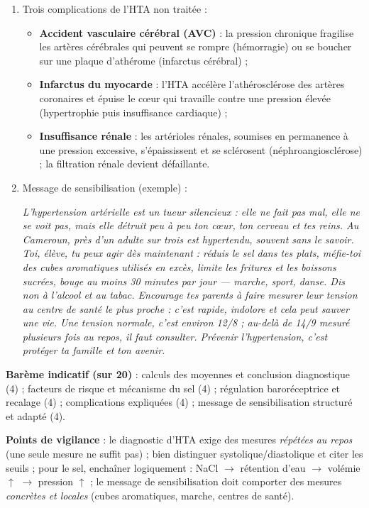 \documentclass[11pt]{article}
\begin{document}
\begin{corrige}
\begin{enumerate}
\item Trois complications de l'HTA non traitée :
\begin{itemize}
\item \textbf{Accident vasculaire cérébral (AVC)} : la pression chronique fragilise les artères cérébrales qui peuvent se rompre (hémorragie) ou se boucher sur une plaque d'athérome (infarctus cérébral) ;
\item \textbf{Infarctus du myocarde} : l'HTA accélère l'athérosclérose des artères coronaires et épuise le cœur qui travaille contre une pression élevée (hypertrophie puis insuffisance cardiaque) ;
\item \textbf{Insuffisance rénale} : les artérioles rénales, soumises en permanence à une pression excessive, s'épaississent et se sclérosent (néphroangiosclérose) ; la filtration rénale devient défaillante.
\end{itemize}
\item Message de sensibilisation (exemple) :

\og \emph{L'hypertension artérielle est un tueur silencieux : elle ne fait pas mal, elle ne se voit pas, mais elle détruit peu à peu ton cœur, ton cerveau et tes reins. Au Cameroun, près d'un adulte sur trois est hypertendu, souvent sans le savoir. Toi, élève, tu peux agir dès maintenant : réduis le sel dans tes plats, méfie-toi des cubes aromatiques utilisés en excès, limite les fritures et les boissons sucrées, bouge au moins 30 minutes par jour — marche, sport, danse. Dis non à l'alcool et au tabac. Encourage tes parents à faire mesurer leur tension au centre de santé le plus proche : c'est rapide, indolore et cela peut sauver une vie. Une tension normale, c'est environ 12/8 ; au-delà de 14/9 mesuré plusieurs fois au repos, il faut consulter. Prévenir l'hypertension, c'est protéger ta famille et ton avenir.} \fg{}
\end{enumerate}
\textbf{Barème indicatif (sur 20)} : calculs des moyennes et conclusion diagnostique (4) ; facteurs de risque et mécanisme du sel (4) ; régulation baroréceptrice et recalage (4) ; complications expliquées (4) ; message de sensibilisation structuré et adapté (4).

\textbf{Points de vigilance} : le diagnostic d'HTA exige des mesures \emph{répétées au repos} (une seule mesure ne suffit pas) ; bien distinguer systolique/diastolique et citer les seuils ; pour le sel, enchaîner logiquement : NaCl $\to$ rétention d'eau $\to$ volémie $\uparrow$ $\to$ pression $\uparrow$ ; le message de sensibilisation doit comporter des mesures \emph{concrètes et locales} (cubes aromatiques, marche, centres de santé).
\end{corrige}
\end{document}
